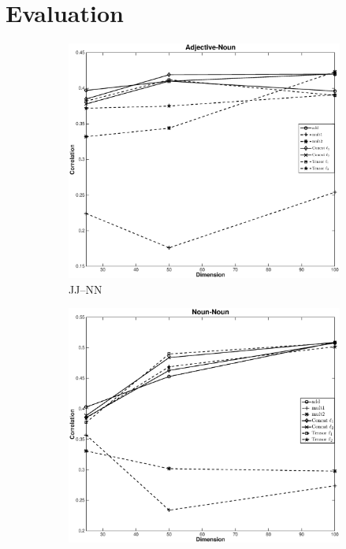 \documentclass[11pt,letterpaper]{article}
\begin{document}
\section{Evaluation}
\label{sec:experiments}

\begin{figure}[t!]
	\begin{center}
	\begin{subfigure}{\columnwidth}
		\centering
		\includegraphics[width=\columnwidth,keepaspectratio=true]{./adj_nn.eps}	
		\caption{\small JJ--NN}
		\label{fig:jj_nn_result}			
	\end{subfigure}
	\begin{subfigure}{\columnwidth}
		\centering
		\includegraphics[width=\columnwidth,keepaspectratio=true]{./nn_nn.eps}		

\end{subfigure}
\end{center}
\end{figure}
\end{document}

